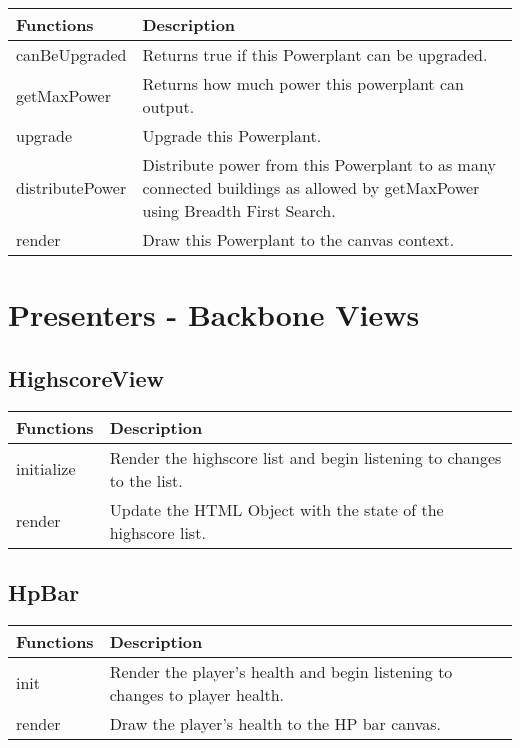 	\begin{table}[H]
	\begin{tabular}{p{4cm} | p{8cm} }
	\hline
	\rowcolor{gray}
	Functions & Description \\ \hline
	canBeUpgraded & Returns true if this Powerplant can be upgraded. \\ \hline
	getMaxPower & Returns how much power this powerplant can output. \\ \hline
	upgrade & Upgrade this Powerplant. \\ \hline
	distributePower & Distribute power from this Powerplant to as many connected buildings as allowed by getMaxPower using Breadth First Search. \\ \hline
	render & Draw this Powerplant to the canvas context. \\ \hline
	\end{tabular}
	\end{table}
	
\clearpage

\section{Presenters - Backbone Views}

\subsection*{HighscoreView}

	\begin{table}[H]
	\begin{tabular}{p{4cm} | p{8cm} }
	\hline
	\rowcolor{gray}
	Functions & Description \\ \hline
	initialize & Render the highscore list and begin listening to changes to the list. \\ \hline
	render & Update the HTML Object with the state of the highscore list. \\ \hline
	\end{tabular}
	\end{table}
	
\subsection*{HpBar}
	
	\begin{table}[H]
	\begin{tabular}{p{4cm} | p{8cm} }
	\hline
	\rowcolor{gray}
	Functions & Description \\ \hline
	init & Render the player's health and begin listening to changes to player health. \\ \hline
	render & Draw the player's health to the HP bar canvas. \\ \hline
	\end{tabular}
	\end{table}
	
